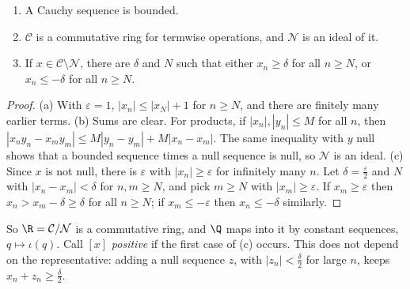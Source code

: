 \begin{lemma}\label{lem:cauchybasic}
\begin{enumerate}[label=(\alph*)]
\item A Cauchy sequence is bounded.
\item $\mathcal C$ is a commutative ring for termwise operations, and $\mathcal N$ is an ideal of it.
\item If $x\in\mathcal C\setminus\mathcal N$, there are $\delta$ and $N$ such that either $x_n\ge\delta$ for all $n\ge N$, or $x_n\le-\delta$ for all $n\ge N$.
\end{enumerate}
\end{lemma}
\begin{proof}
(a) With $\varepsilon=1$, $|x_n|\le|x_N|+1$ for $n\ge N$, and there are finitely many earlier terms. (b) Sums are clear. For
products, if $|x_n|,|y_n|\le M$ for all $n$, then $|x_ny_n-x_my_m|\le M|y_n-y_m|+M|x_n-x_m|$. The same inequality with $y$ null shows
that a bounded sequence times a null sequence is null, so $\mathcal N$ is an ideal. (c) Since $x$ is not null, there is $\varepsilon$ with
$|x_n|\ge\varepsilon$ for infinitely many $n$. Let $\delta=\frac\varepsilon2$ and $N$ with $|x_n-x_m|<\delta$ for $n,m\ge N$, and pick $m\ge N$ with $|x_m|\ge\varepsilon$. If
$x_m\ge\varepsilon$ then $x_n>x_m-\delta\ge\delta$ for all $n\ge N$; if $x_m\le-\varepsilon$ then $x_n\le-\delta$ similarly.
\end{proof}

So $\R=\mathcal C/\mathcal N$ is a commutative ring, and $\Q$ maps into it by constant sequences, $q\mapsto\iota(q)$. Call $[x]$ \emph{positive}
if the first case of (c) occurs. This does not depend on the representative: adding a null sequence $z$, with
$|z_n|<\frac\delta2$ for large $n$, keeps $x_n+z_n\ge\frac\delta2$.

